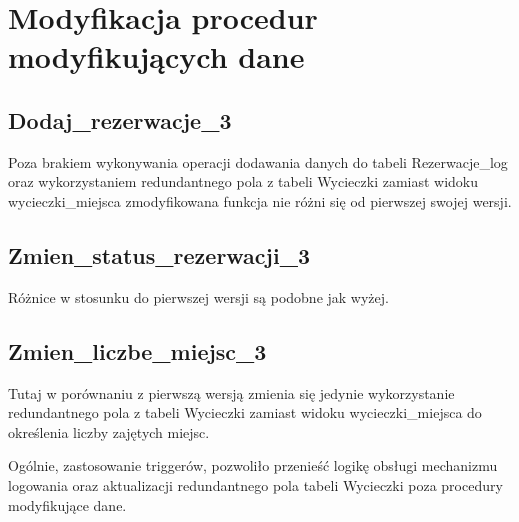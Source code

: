 \documentclass[12pt, a4paper]{mwrep}
\begin{document}
\section{Modyfikacja procedur modyfikujących dane}

\subsection{Dodaj\_rezerwacje\_3}



Poza brakiem wykonywania operacji dodawania danych do tabeli Rezerwacje\_log oraz wykorzystaniem redundantnego pola z tabeli Wycieczki zamiast widoku wycieczki\_miejsca zmodyfikowana funkcja nie różni się od pierwszej swojej wersji.

\subsection{Zmien\_status\_rezerwacji\_3}



Różnice w stosunku do pierwszej wersji są podobne jak wyżej.

\subsection{Zmien\_liczbe\_miejsc\_3}



Tutaj w porównaniu z pierwszą wersją zmienia się jedynie wykorzystanie redundantnego pola z tabeli Wycieczki zamiast widoku wycieczki\_miejsca do określenia liczby zajętych miejsc. 

Ogólnie, zastosowanie triggerów, pozwoliło przenieść logikę obsługi mechanizmu logowania oraz aktualizacji redundantnego pola tabeli Wycieczki poza procedury modyfikujące dane.
\end{document}
